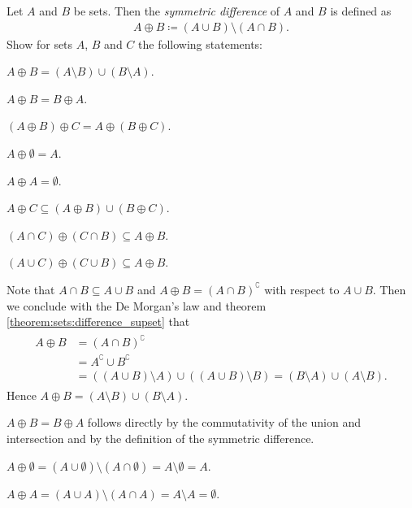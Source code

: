 \begin{exercise}\label{exercise:sets:symmetric_difference_properties}
    Let $A$ and $B$ be sets. Then the \emph{symmetric difference} of $A$ and $B$ is defined as \begin{align}A\oplus B\coloneq (A\cup B)\setminus (A\cap B).\end{align} Show for sets $A$, $B$ and $C$ the following statements:
    \begin{exerciseenumerate}
        \item $A\oplus B=(A\setminus B)\cup(B\setminus A)$.
        \item $A\oplus B=B\oplus A$.
        \item $(A\oplus B)\oplus C=A\oplus(B\oplus C)$.
        \item $A\oplus \emptyset=A$.
        \item $A\oplus A=\emptyset$.
        \item $A\oplus C\subseteq (A\oplus B)\cup (B\oplus C)$.
        \item $(A\cap C)\oplus (C\cap B)\subseteq A\oplus B$.
        \item $(A\cup C)\oplus (C\cup B)\subseteq A\oplus B$.
    \end{exerciseenumerate}
\end{exercise}
\begin{solution}
    \begin{solutionenumerate}
        \item Note that $A\cap B\subseteq A\cup B$ and $A\oplus B=(A\cap B)^\complement$ with respect to $A\cup B$. Then we conclude with the De Morgan's law and theorem \ref{theorem:sets:difference_supset} that
        \begin{align}\begin{split}
        A\oplus B&=(A\cap B)^\complement\\&=A^\complement\cup B^\complement\\
        &=((A\cup B)\setminus A)\cup((A\cup B)\setminus B)=(B\setminus A)\cup (A\setminus B).
        \end{split}\end{align}
        Hence $A\oplus B=(A\setminus B)\cup(B\setminus A)$.
        \item $A\oplus B=B\oplus A$ follows directly by the commutativity of the union and intersection and by the definition of the symmetric difference.
        \item 
        \item $A\oplus\emptyset=(A\cup\emptyset)\setminus (A\cap\emptyset)=A\setminus\emptyset=A$.
        \item $A\oplus A=(A\cup A)\setminus (A\cap A)=A\setminus A=\emptyset$.
        \item 
        \item 
        \item 
    \end{solutionenumerate}
\end{solution}

